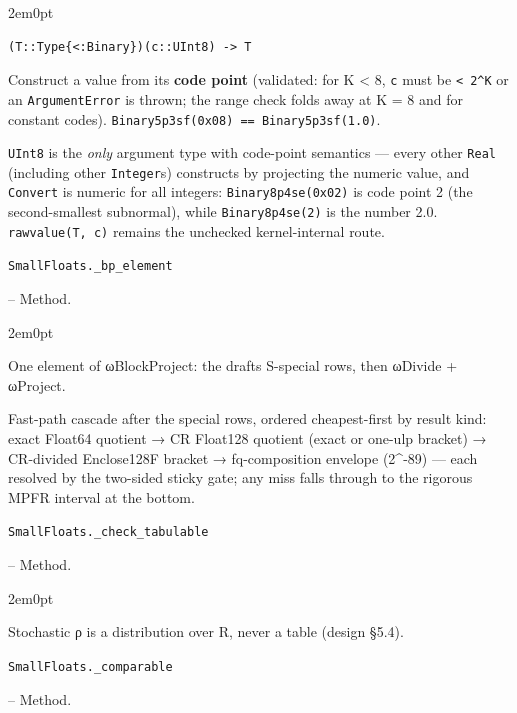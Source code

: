 \begin{adjustwidth}{2em}{0pt}


\begin{verbatim}
(T::Type{<:Binary})(c::UInt8) -> T
\end{verbatim}

Construct a value from its \textbf{code point} (validated: for K < 8, \texttt{c} must be \texttt{< 2{\textasciicircum}K} or an \texttt{ArgumentError} is thrown; the range check folds away at K = 8 and for constant codes). \texttt{Binary5p3sf(0x08) == Binary5p3sf(1.0)}.

\texttt{UInt8} is the \emph{only} argument type with code-point semantics — every other \texttt{Real} (including other \texttt{Integer}s) constructs by projecting the numeric value, and \texttt{Convert} is numeric for all integers: \texttt{Binary8p4se(0x02)} is code point 2 (the second-smallest subnormal), while \texttt{Binary8p4se(2)} is the number 2.0. \texttt{rawvalue(T, c)} remains the unchecked kernel-internal route.



\end{adjustwidth}
\hypertarget{17928462762263157549}{\texttt{SmallFloats.\_bp\_element}}  -- {Method.}

\begin{adjustwidth}{2em}{0pt}

One element of ωBlockProject: the draft{\textquotesingle}s S-special rows, then ωDivide + ωProject.

Fast-path cascade after the special rows, ordered cheapest-first by result kind: exact Float64 quotient → CR Float128 quotient (exact or one-ulp bracket) → CR-divided Enclose128F bracket → fq-composition envelope (2{\textasciicircum}-89) — each resolved by the two-sided sticky gate; any miss falls through to the rigorous MPFR interval at the bottom.



\end{adjustwidth}
\hypertarget{15953021384962181472}{\texttt{SmallFloats.\_check\_tabulable}}  -- {Method.}

\begin{adjustwidth}{2em}{0pt}

Stochastic ρ is a distribution over R, never a table (design §5.4).



\end{adjustwidth}
\hypertarget{12008461486952181445}{\texttt{SmallFloats.\_comparable}}  -- {Method.}

